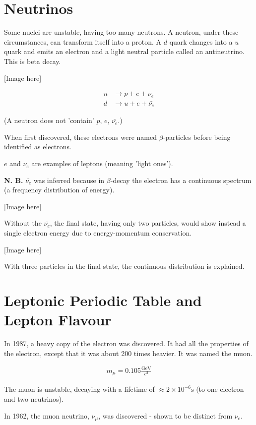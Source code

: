 \documentclass[10pt,a4paper]{article}
\newcommand{\gevcc}{\frac{\mathrm{GeV}}{c^2}}
\begin{document}
\section*{Neutrinos}

Some nuclei are unstable, having too many neutrons. A neutron, under these circumstances, can transform itself into a proton. A $d$ quark changes into a $u$ quark and emits an electron and a light neutral particle called an antineutrino. This is beta decay.

[Image here]

\begin{align*}
n & \rightarrow p + e + \bar{\nu_e} \\
d & \rightarrow u + e + \bar{\nu_e}
\end{align*}

(A neutron does not 'contain' $p$, $e$, $\bar{\nu_e}$.)

When first discovered, these electrons were named $\beta$-particles before being identified as electrons.

$e$ and $\nu_e$ are examples of leptons (meaning 'light ones').

\textbf{N. B.} $\bar{\nu_e}$ was inferred because in $\beta$-decay the electron has a continuous spectrum (a frequency distribution of energy).

[Image here]

Without the $\bar{\nu_e}$, the final state, having only two particles, would show instead a single electron energy due to energy-momentum conservation.

[Image here]

With three particles in the final state, the continuous distribution is explained.

\section*{Leptonic Periodic Table and Lepton Flavour}

In 1987, a heavy copy of the electron was discovered. It had all the properties of the electron, except that it was about 200 times heavier. It was named the muon.

\begin{align*}
m_{\mu} = 0.105 \gevcc
\end{align*}

The muon is unstable, decaying with a lifetime of $\approx 2 \times 10^{-6} \mathrm{s}$ (to one electron and two neutrinos).

In 1962, the muon neutrino, $\nu_{\mu}$, was discovered - shown to be distinct from $\nu_e$.
\end{document}
